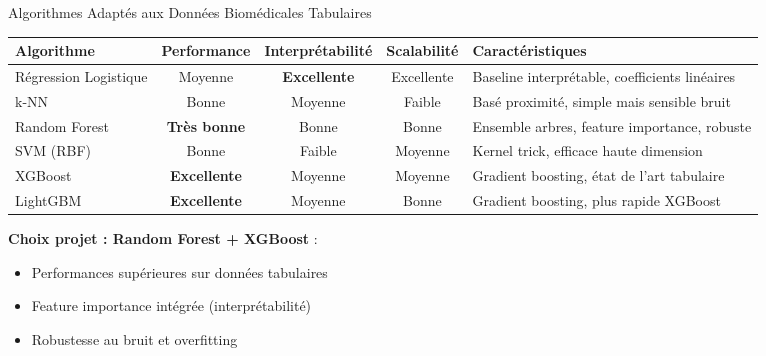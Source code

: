 \documentclass[11pt, aspectratio=169]{beamer}
\begin{document}
\begin{frame}{Algorithmes Adaptés aux Données Biomédicales Tabulaires}
  \begin{table}[h]
    \tiny
    \centering
    \begin{tabularx}{\textwidth}{|l|c|c|c|X|}
      \toprule
      \textbf{Algorithme} & \textbf{Performance} & \textbf{Interprétabilité} & \textbf{Scalabilité} & \textbf{Caractéristiques} \\
      \midrule
      Régression Logistique & Moyenne & \textbf{Excellente} & Excellente & Baseline interprétable, coefficients linéaires \\
      k-NN & Bonne & Moyenne & Faible & Basé proximité, simple mais sensible bruit \\
      Random Forest & \textbf{Très bonne} & Bonne & Bonne & Ensemble arbres, feature importance, robuste \\
      SVM (RBF) & Bonne & Faible & Moyenne & Kernel trick, efficace haute dimension \\
      XGBoost & \textbf{Excellente} & Moyenne & Moyenne & Gradient boosting, état de l'art tabulaire \\
      LightGBM & \textbf{Excellente} & Moyenne & Bonne & Gradient boosting, plus rapide XGBoost \\
      \bottomrule
    \end{tabularx}
  \end{table}
  
  \vspace{0.6em}
  
  \textbf{\textcolor{accent2}{Choix projet : Random Forest + XGBoost}} :
  \begin{itemize}
    \item Performances supérieures sur données tabulaires
    \item Feature importance intégrée (interprétabilité)
    \item Robustesse au bruit et overfitting
  \end{itemize}
\end{frame}
\end{document}

